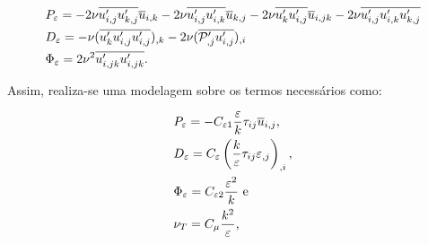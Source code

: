 \documentclass[_ArquivoPrincipal.tex]{subfiles}
\begin{document}
\begin{subequations}
    \begin{align}
         & P_\varepsilon=-2\nu\overline{u'_{i,j}u'_{k,j}}\overline{u}_{i,k}-2\nu\overline{u'_{i,j}u'_{i,k}}\overline{u}_{k,j}-2\nu\overline{u'_ku'_{i,j}}\overline{u}_{i,jk}-2\nu\overline{u'_{i,j}u'_{i,k}u'_{k,j}} \\
         & D_\varepsilon=-\nu(\overline{u'_ku'_{i,j}u'_{i,j}})_{,k}-2\nu(\overline{\mathcal{P}'_{,j}u'_{i,j}})_{,i}                                                                                   \\
         & \Phi_\varepsilon=2\nu^2\overline{u'_{i,jk}u'_{i,jk}}\text{.}
    \end{align}
\end{subequations}

\begin{comment}
Já o tensor de Reynolds pode ser subdividido em duas parcelas: uma parte isotrópica ($\tau_{ij}^I$) e outra desviadora ($\tau_{ij}^D$), ou seja:

\begin{equation}
    \tau_{ij}=\tau_{ij}^I+\tau_{ij}^D\text{,}
\end{equation}

\noindent em que:

\begin{subequations}
    \begin{align}
         & \tau_{ij}^I=-\frac{2}{3}k\delta_{ij}\text{ e} \\
         & \tau_{ij}^D=2\nu_T\epmean_{ij}\text{,}
    \end{align}
\end{subequations}

\noindent $\epmean_{ij}$ é a taxa de deformação do campo de velocidades média:

\begin{equation}
    \epmean_{ij}=\frac{\bar{u}_{i,j}+\bar{u}_{j,i}}{2}
\end{equation}

\noindent e $\nu_T$ é a viscosidade de vórtice.
\end{comment}

Assim, realiza-se uma modelagem sobre os termos necessários como:

\begin{subequations}
    \begin{align}
         & P_\varepsilon=-C_{\varepsilon 1}\frac{\varepsilon}{k}\tau_{ij}\overline{u}_{i,j}\text{,}     \\
         & D_\varepsilon=C_\varepsilon\left({\frac{k}{\varepsilon}\tau_{ij}\varepsilon_{,j}}\right)_{,i}\text{,} \\
         & \Phi_\varepsilon=C_{\varepsilon 2}\frac{\varepsilon^2}{k}\text{ e}                      \\
         & \nu_T=C_\mu\frac{k^2}{\varepsilon}\text{,}
    \end{align}
\end{subequations}
\end{document}
